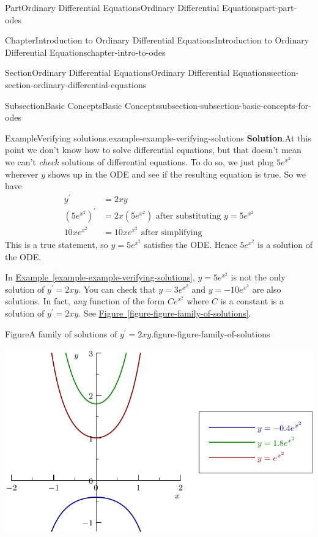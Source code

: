 \documentclass[twoside,10pt,]{book}
\newcommand{\blocktitlefont}{\relax}
\newcommand{\xreffont}{\relax}
\numberwithin{equation}{part}
\begin{document}
\begin{partptx}{Part}{Ordinary Differential Equations}{}{Ordinary Differential Equations}{}{}{part-part-odes}
\begin{chapterptx}{Chapter}{Introduction to Ordinary Differential Equations}{}{Introduction to Ordinary Differential Equations}{}{}{chapter-intro-to-odes}
\begin{sectionptx}{Section}{Ordinary Differential Equations}{}{Ordinary Differential Equations}{}{}{section-section-ordinary-differential-equations}
\begin{subsectionptx}{Subsection}{Basic Concepts}{}{Basic Concepts}{}{}{subsection-subsection-basic-concepts-for-odes}
\begin{example}{Example}{Verifying solutions.}{example-example-verifying-solutions}
\noindent\textbf{\blocktitlefont Solution}.\hypertarget{solution-example-verifying-solutions-c}{}\quad{}At this point we don't know how to solve differential equations, but that doesn't mean we can't \emph{check} solutions of differential equations. To do so, we just plug \(5e^{x^{2}}\) wherever \(y\) shows up in the ODE and see if the resulting equation is true. So we have%
\begin{align*}
y^\prime & = 2xy \\
(5e^{x^{2}})^\prime & = 2x(5e^{x^{2}}) \text{ after substituting }y = 5e^{x^{2}}\\
10xe^{x^{2}} & = 10xe^{x^{2}} \text{ after simplifying} 
\end{align*}
This is a true statement, so \(y = 5e^{x^{2}}\) satisfies the ODE. Hence \(5e^{x^{2}}\) is a solution of the ODE.%
\end{example}
In \hyperref[example-example-verifying-solutions]{Example~{\xreffont\ref{example-example-verifying-solutions}}}, \(y = 5e^{x^{2}}\) is not the only solution of \(y^\prime = 2xy\). You can check that \(y = 3e^{x^{2}}\) and \(y = -10e^{x^{2}}\) are also solutions. In fact, \emph{any} function of the form \(Ce^{x^{2}}\) where \(C\) is a constant is a solution of \(y^\prime = 2xy\). See \hyperref[figure-figure-family-of-solutions]{Figure~{\xreffont\ref{figure-figure-family-of-solutions}}}.%
\begin{figureptx}{Figure}{A family of solutions of \(y^\prime = 2xy\).}{figure-figure-family-of-solutions}{}%
\begin{image}{0}{1}{0}{}%
\includegraphics[width=\linewidth]{generated/asymptote/image-1.pdf}
\end{image}%
\tcblower
\end{figureptx}%

\end{subsectionptx}
\end{sectionptx}
\end{chapterptx}
\end{partptx}
\end{document}
